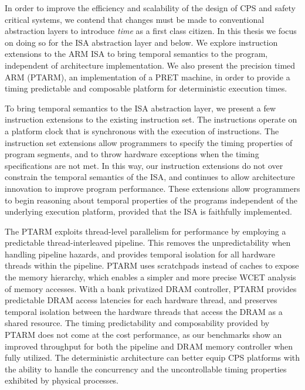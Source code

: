 In order to improve the efficiency and scalability of the design of CPS and safety critical systems, we contend that changes must be made to conventional abstraction layers to introduce \emph{time} as a first class citizen.
In this thesis we focus on doing so for the ISA abstraction layer and below.  
We explore instruction extensions to the ARM ISA to bring temporal semantics to the program, independent of architecture implementation.  
We also present the precision timed ARM (PTARM), an implementation of a PRET machine, in order to provide a timing predictable and composable platform for deterministic execution times.  

To bring temporal semantics to the ISA abstraction layer, we present a few instruction extensions to the existing instruction set. 
The instructions operate on a platform clock that is synchronous with the execution of instructions. 
The instruction set extensions allow programmers to specify the timing properties of program segments, and to throw hardware exceptions when the timing specifications are not met.
In this way, our instruction extensions do not over constrain the temporal semantics of the ISA, and continues to allow architecture innovation to improve program performance. 
These extensions allow programmers to begin reasoning about temporal properties of the programs independent of the underlying execution platform, provided that the ISA is faithfully implemented.

The PTARM exploits thread-level parallelism for performance by employing a predictable thread-interleaved pipeline. 
This removes the unpredictability when handling pipeline hazards, and provides temporal isolation for all hardware threads within the pipeline.
PTARM uses scratchpads instead of caches to expose the memory hierarchy, which enables a simpler and more precise WCET analysis of memory accesses.  
With a bank privatized DRAM controller, PTARM provides predictable DRAM access latencies for each hardware thread, and preserves temporal isolation between the hardware threads that access the DRAM as a shared resource.
The timing predictability and composability provided by PTARM does not come at the cost performance, as our benchmarks show an improved throughput for both the pipeline and DRAM memory controller when fully utilized.  
The deterministic architecture can better equip CPS platforms with the ability to handle the concurrency and the uncontrollable timing properties exhibited by physical processes.

